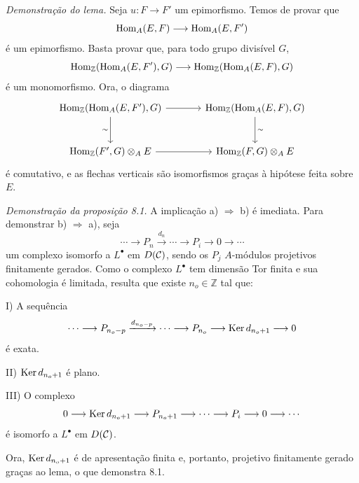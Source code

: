 \emph{Demonstração do lema.} Seja $u:F\to F'$ um epimorfismo. Temos de provar que
\[
\operatorname{Hom}_A(E,F)\longrightarrow\operatorname{Hom}_A(E,F')
\]
é um epimorfismo. Basta provar que, para todo grupo divisível $G$,
\[
\operatorname{Hom}_{\mathbb Z}(\operatorname{Hom}_A(E,F'),G)\longrightarrow
\operatorname{Hom}_{\mathbb Z}(\operatorname{Hom}_A(E,F),G)
\]
é um monomorfismo. Ora, o diagrama
\[
\begin{tikzcd}[column sep=large,row sep=large]
\Hom_{\mathbb Z}(\Hom_A(E,F'),G)
 \arrow[r]\arrow[d,"\sim"']&
\Hom_{\mathbb Z}(\Hom_A(E,F),G)\arrow[d,"\sim"]\\
\Hom_{\mathbb Z}(F',G)\otimes_A E
 \arrow[r]&
\Hom_{\mathbb Z}(F,G)\otimes_A E
\end{tikzcd}
\]
é comutativo, e as flechas verticais são isomorfismos graças à hipótese feita sobre $E$.

\emph{Demonstração da proposição 8.1.} A implicação a) $\Rightarrow$ b) é imediata. Para demonstrar b) $\Rightarrow$ a), seja
\[
\cdots\longrightarrow P_n\xrightarrow{d_n}\cdots\longrightarrow P_i\longrightarrow 0\longrightarrow\cdots
\]
um complexo isomorfo a $L^\bullet$ em $D(\mathcal C)$, sendo os $P_j$ $A$-módulos projetivos finitamente gerados. Como o complexo $L^\bullet$ tem dimensão Tor finita e sua cohomologia é limitada, resulta que existe $n_o\in\mathbb Z$ tal que:

I) A sequência
\[
\cdots\longrightarrow P_{n_o-p}\xrightarrow{d_{n_o-p}}\cdots\longrightarrow
P_{n_o}\longrightarrow \operatorname{Ker} d_{n_o+1}\longrightarrow0
\]
é exata.

II) $\operatorname{Ker} d_{n_o+1}$ é plano.

III) O complexo
\[
0\longrightarrow \operatorname{Ker} d_{n_o+1}\longrightarrow P_{n_o+1}\longrightarrow\cdots\longrightarrow P_i\longrightarrow0\longrightarrow\cdots
\]
é isomorfo a $L^\bullet$ em $D(\mathcal C)$.

Ora, $\operatorname{Ker} d_{n_o+1}$ é de apresentação finita e, portanto, projetivo finitamente gerado graças ao lema, o que demonstra 8.1.
